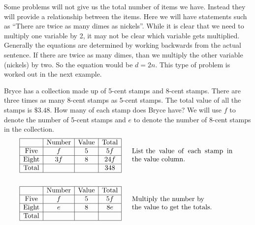 Some problems will not give us the total number of items we have. Instead they
will provide a relationship between the items. Here we will have statements such
as ``There are twice as many dimes as nickels''. While it is clear that we
need to multiply one variable by 2, it may not be clear which variable gets
multiplied. Generally the equations are determined by working backwards from the actual
sentence. If there are twice as many dimes, than we multiply the other
variable (nickels) by two. So the equation would be $d = 2 n$. This type of
problem is worked out in the next example.

\begin{example}
  Bryce has a collection made up of 5-cent stamps and 8-cent
  stamps. There are three times as many 8-cent stamps as 5-cent stamps. The
  total value of all the stamps is $\$3.48$. How many of each stamp
  does Bryce have?\pp
	We will use $f$ to denote the number of 5-cent stamps and $e$ to denote the number of 8-cent stamps in the collection.
  \begin{eqnarray*}
    \begin{array}{|c|c|c|c|}
      \hline
      & \tmop{Number} & \tmop{Value} & \tmop{Total}\\
      \hline
      \tmop{Five} & f & 5 & 5 f\\
      \hline
      \tmop{Eight} & 3 f & 8 & 24 f\\
      \hline
      \tmop{Total} &  &  & 348\\
      \hline
    \end{array} &  & \begin{array}{p{0.425\textwidth}}
      \tmop{List~the} \tmop{value} \tmop{of} \tmop{each} \tmop{stamp}
      \tmop{in} \tmop{the} \tmop{value} \tmop{column}.
    \end{array}\\
    &  & \\
    \begin{array}{|c|c|c|c|}
      \hline
      & \tmop{Number} & \tmop{Value} & \tmop{Total}\\
      \hline
      \tmop{Five} & f & 5 & 5 f\\
      \hline
      \tmop{Eight} & e & 8 & 8 e\\
      \hline
      \tmop{Total} &  &  & \\
      \hline
    \end{array} &  & \begin{array}{p{0.425\textwidth}}
		\text{Multiply~the~number~by} \text{the~value} \text{to~get} \text{the~totals}.\\

\end{array}
\end{eqnarray*}
\end{example}
